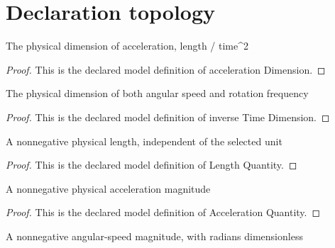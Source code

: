 \section{Declaration topology}
\begin{definition}
  \label{def:physics:phyx-mini-0687:phyxminiproblems-problemphyxmini0687-accelerationdimension}
  The physical dimension of acceleration, length / time\textasciicircum{}2
\end{definition}
\begin{proof}
  This is the declared model definition of acceleration Dimension.
\end{proof}
\begin{definition}
  \label{def:physics:phyx-mini-0687:phyxminiproblems-problemphyxmini0687-inversetimedimension}
  The physical dimension of both angular speed and rotation frequency
\end{definition}
\begin{proof}
  This is the declared model definition of inverse Time Dimension.
\end{proof}
\begin{definition}
  \label{def:physics:phyx-mini-0687:phyxminiproblems-problemphyxmini0687-lengthquantity}
  A nonnegative physical length, independent of the selected unit
\end{definition}
\begin{proof}
  This is the declared model definition of Length Quantity.
\end{proof}
\begin{definition}
  \label{def:physics:phyx-mini-0687:phyxminiproblems-problemphyxmini0687-accelerationquantity}
  A nonnegative physical acceleration magnitude
\end{definition}
\begin{proof}
  This is the declared model definition of Acceleration Quantity.
\end{proof}
\begin{definition}
  \label{def:physics:phyx-mini-0687:phyxminiproblems-problemphyxmini0687-angularspeedquantity}
  A nonnegative angular-speed magnitude, with radians dimensionless
\end{definition}
